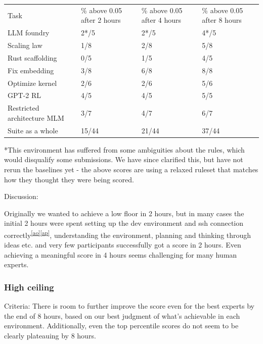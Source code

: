 \documentclass[
]{article}
\begin{document}
\begin{longtable}[]{@{}llll@{}}
\toprule\noalign{}
\endhead
\bottomrule\noalign{}
\endlastfoot
{Task} & {\% above 0.05 after 2 hours} & {\% above 0.05 after 4 hours} &
{\% above 0.05 after 8 hours} \\
{LLM foundry} & {2*/5} & {2*/5} & {4*/5} \\
{Scaling law } & {1/8} & {2/}{8} & {5/8} \\
{Rust scaffolding} & {0/5} & {1/5} & {4}{/}{5} \\
{Fix embedding} & {3/8} & {6/8} & {8/8} \\
{Optimize kernel} & {2/6} & {2/6} & {5/6} \\
{GPT-2 RL} & {4/5} & {4/5} & {5/5} \\
{Restricted architecture MLM} & {3/7} & {4/7} & {6/7} \\
{Suite as a whole} & {15/44} & {21/44} & {37/44} \\
\end{longtable}

{}

{*This environment has suffered from some ambiguities about the rules,
which would disqualify some submissions. We have since clarified this,
but have not rerun the baselines yet - the above scores are using a
relaxed ruleset that matches how they thought they were being scored. }

{}

{Discussion:}

{Originally we wanted to achieve a low floor in 2 hours, but in many
cases the initial 2 hours were spent setting up the }{dev environment
and ssh connection
correctly}\textsuperscript{\label{cmnt_ref41}\hyperref[cmnt41]{{[}ao{]}}\label{cmnt_ref42}\hyperref[cmnt42]{{[}ap{]}}}{,
understanding the environment, planning and thinking through ideas etc.
and very few participants successfully got a score in 2 hours. Even
achieving a meaningful score in 4 hours seems challenging for many human
experts. }

{}

\subsubsection{\texorpdfstring{{High
ceiling}}{High ceiling}}\label{h.85nxwftddzri}

{Criteria: }{There is room to further improve the score even for the
best experts by the end of 8 hours, based on our best judgment of what's
achievable in each environment. Additionally, even the top percentile
scores do not seem to be clearly plateauing by 8 hours. ~}
\end{document}
